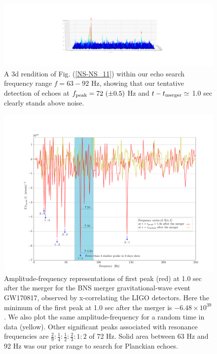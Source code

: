 \documentclass[12pt]{article}
\begin{document}
\begin{figure}[!tbp]
    \includegraphics[width=\textwidth]{3d.pdf}
 \caption{A 3d rendition of Fig. (\ref{NS-NS_11}) within our echo search frequency range $f=63-92$ Hz, showing that our tentative detection of echoes at  $f_{\rm{peak}}=72\ (\pm 0.5)$ Hz and $t-t_{\rm{merger}} \simeq $ 1.0 sec clearly stands above noise. }
 \label{NS-NS_3d}
\end{figure}

\begin{figure}[!tbp]
    \includegraphics[width=1\textwidth]{peaks_in_frequency_05_sec.pdf}
 \caption{Amplitude-frequency representations of first peak (red) at 1.0 sec after the merger for the BNS merger gravitational-wave event GW170817, observed by x-correlating the LIGO detectors. Here the minimum of the first peak at 1.0 sec after the merger is $-6.48\times10^{39}$. We also plot the same amplitude-frequency for a random time in data (yellow). Other significant peaks associated with resonance frequencies are $\frac{2}{9}:\frac{1}{4}:\frac{1}{2}:\frac{2}{3}:1:2$ of 72 Hz.  Solid area between 63 Hz and 92 Hz was our prior range to search for Planckian echoes.}
 \label{NS-NS_4}
\end{figure}
\end{document}
